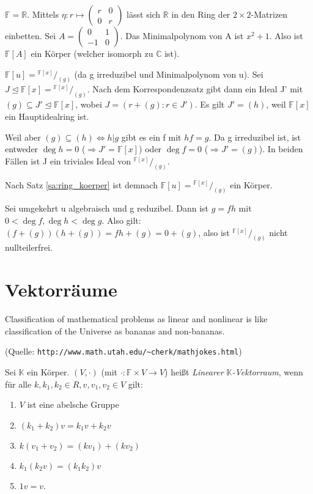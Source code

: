 \documentclass[10pt]{scrbook}
\begin{document}
\begin{Bsp}
$\mathbb{F}=\mathbb{R}$. Mittels $\eta: r\mapsto \left(
\begin{array}{ll}
	r & 0 \\
	0 & r 
\end{array}\right)$ lässt sich $\mathbb{R}$ in den Ring der $2\times 2$-Matrizen einbetten. Sei $A=\left(
\begin{array}{ll}
	0 & 1 \\
	-1 & 0 
\end{array}\right)$. Das Minimalpolynom von A ist $x^2+1$. Also ist $\mathbb{F}[A]$ ein Körper (welcher isomorph zu $\mathbb{C}$ ist).
\end{Bsp}

\begin{bew}
$\mathbb{F}[u]={}^{\mathbb{F}[x]}/_{(g)}$ (da g irreduzibel und Minimalpolynom von u). Sei $J\trianglelefteq \mathbb{F}[x]={}^{\mathbb{F}[x]}/_{(g)}$. Nach dem Korrespondenzsatz gibt dann ein Ideal J' mit $(g)\subseteq J'\trianglelefteq \mathbb{F}[x]$, wobei $J=(r+(g): r\in J')$. Es gilt $J'=(h)$, weil
$\mathbb{F}[x]$ ein Hauptidealring ist.

Weil aber $(g)\subseteq (h)\Leftrightarrow h | g$ gibt es ein f mit $h f=g$. Da g irreduzibel ist, ist entweder $\deg h=0$ ($\Rightarrow J'=\mathbb{F}[x]$) oder $\deg f=0$ ($\Rightarrow J'=(g)$). In beiden Fällen ist J ein triviales Ideal von ${}^{\mathbb{F}[x]}/_{(g)}$.

Nach Satz \ref{sa:ring_koerper} ist demnach $\mathbb{F}[u]={}^{\mathbb{F}[x]}/_{(g)}$ ein Körper.

Sei umgekehrt u algebraisch und g reduzibel. Dann ist $g=f h$ mit $0<\deg f, \deg h < \deg g$. Also gilt: $(f+(g))(h+(g))=f h +(g)=0+(g)$, also ist ${}^{\mathbb{F}[x]}/_{(g)}$ nicht nullteilerfrei.
\end{bew}

\section{Vektorräume}

Classification of mathematical problems as linear and nonlinear is like classification of the Universe as bananas and non-bananas. 

(Quelle: \verb|http://www.math.utah.edu/~cherk/mathjokes.html|)

\begin{Def}
Sei $\mathbb{K}$ ein Körper. $(V, \cdot)$ (mit $\cdot: \mathbb{F}\times V \rightarrow V$) heißt \emph{Linearer $\mathbb{K}$-Vektorraum}, wenn für alle $k, k_1, k_2\in R, v, v_1, v_2\in V$ gilt:
\begin{enumerate}
	\item $V$ ist eine abelsche Gruppe
	\item $(k_1+k_2) v = k_1 v+k_2 v$
	\item $k (v_1+v_2)=(k v_1)+(k v_2)$
	\item $k_1 (k_2 v) = (k_1 k_2) v$
	\item $1 v=v$.
\end{enumerate}
\end{Def}
\end{document}
